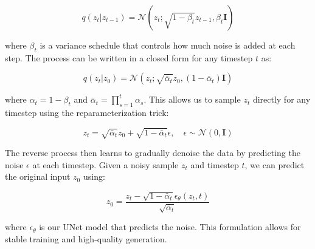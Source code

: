 \begin{equation}
    q(z_t|z_{t-1}) = \mathcal{N}(z_t; \sqrt{1-\beta_t}z_{t-1}, \beta_t\mathbf{I})
\end{equation}

\noindent where $\beta_t$ is a variance schedule that controls how much noise is added at each step. The process can be written in a closed form for any timestep $t$ as:

\begin{equation}
    q(z_t|z_0) = \mathcal{N}(z_t; \sqrt{\bar{\alpha}_t}z_0, (1-\bar{\alpha}_t)\mathbf{I})
\end{equation}

\noindent where $\alpha_t = 1-\beta_t$ and $\bar{\alpha}_t = \prod_{s=1}^t \alpha_s$. This allows us to sample $z_t$ directly for any timestep using the reparameterization trick:

\begin{equation}
    z_t = \sqrt{\bar{\alpha}_t}z_0 + \sqrt{1-\bar{\alpha}_t}\epsilon, \quad \epsilon \sim \mathcal{N}(0, \mathbf{I})
\end{equation}

The reverse process then learns to gradually denoise the data by predicting the noise $\epsilon$ at each timestep. Given a noisy sample $z_t$ and timestep $t$, we can predict the original input $z_0$ using:

\begin{equation}
    z_0 = \frac{z_t - \sqrt{1-\bar{\alpha}_t}\epsilon_\theta(z_t,t)}{\sqrt{\bar{\alpha}_t}}
\end{equation}

\noindent where $\epsilon_\theta$ is our UNet model that predicts the noise. This formulation allows for stable training and high-quality generation.


